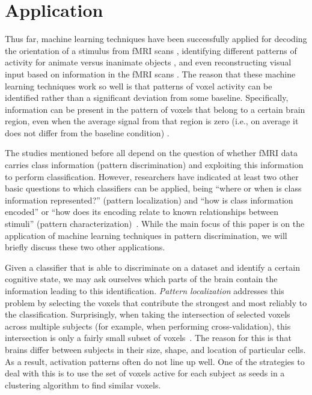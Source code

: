 \documentclass[preprint,journal,11pt]{vgtc}
\begin{document}


\section{Application}
\label{sec:application}

Thus far, machine learning techniques have been successfully applied for decoding the orientation of a stimulus from fMRI scans \cite{ka:2005decoding}, identifying different patterns of activity for animate versus inanimate objects \cite{kr:2008RSA}, and even reconstructing visual input based on information in the fMRI scans \cite{mi:2008re}. The reason that these machine learning techniques work so well is that patterns of voxel activity can be identified rather than a significant deviation from some baseline. Specifically, information can be present in the pattern of voxels that belong to a certain brain region, even when the average signal from that region is zero (i.e., on average it does not differ from the baseline condition) \cite{to:2012rev}.

The studies mentioned before all depend on the question of whether fMRI data carries class information (pattern discrimination) and exploiting this information to perform classification. However, researchers have indicated at least two other basic questions to which classifiers can be applied, being ``where or when is class information represented?'' (pattern localization) and ``how is class information encoded'' or ``how does its encoding relate to known relationships between stimuli'' (pattern characterization)~\cite{pereira2009machine}. While the main focus of this paper is on the application of machine learning techniques in pattern discrimination, we will briefly discuss these two other applications.

Given a classifier that is able to discriminate on a dataset and identify a certain cognitive state, we may ask ourselves which parts of the brain contain the information leading to this identification. \emph{Pattern localization} addresses this problem by selecting the voxels that contribute the strongest and most reliably to the classification. Surprisingly, when taking the intersection of selected voxels across multiple subjects (for example, when performing cross-validation), this intersection is only a fairly small subset of voxels~\cite{pereira2009machine}. The reason for this is that brains differ between subjects in their size, shape, and location of particular cells. As a result, activation patterns often do not line up well. One of the strategies to deal with this is to use the set of voxels active for each subject as seeds in a clustering algorithm to find similar voxels.
\end{document}
